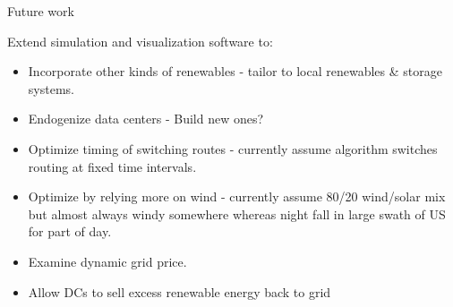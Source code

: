 \documentclass[xcolor=dvipsnames]{beamer}
\begin{document}

\begin{frame}{Future work}

Extend simulation and visualization software to:

\begin{itemize}
\item Incorporate other kinds of renewables - tailor to local renewables \& storage systems.
\item Endogenize data centers - Build new ones? 
\item Optimize timing of switching routes - currently assume algorithm switches routing at fixed time intervals. 
\item Optimize by relying more on wind - currently assume 80/20 wind/solar mix but almost always windy somewhere whereas night fall in large swath of US for part of day. 
\item Examine dynamic grid price.  
\item Allow DCs to sell excess renewable energy back to grid
\end{itemize}

\end{frame}
\end{document}
